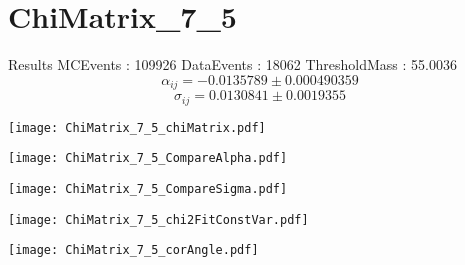 \documentclass[a4paper,12pt]{article}
\begin{document}
\section{ChiMatrix\_7\_5}
\begin{minipage}{0.49\linewidth} Results \newline
MCEvents : 109926\newline
DataEvents : 18062 \newline
ThresholdMass : 55.0036\\
$$\alpha_{ij} = -0.0135789\pm 0.000490359$$
$$\sigma_{ij} = 0.0130841\pm 0.0019355$$
\end{minipage}\hfill
\begin{minipage}{0.49\linewidth} 
\texttt{[image: ChiMatrix\_7\_5\_chiMatrix.pdf]}\\
\end{minipage}
\hfill
\begin{minipage}{0.49\linewidth} 
\texttt{[image: ChiMatrix\_7\_5\_CompareAlpha.pdf]}\\
\end{minipage}
\hfill
\begin{minipage}{0.49\linewidth} 
\texttt{[image: ChiMatrix\_7\_5\_CompareSigma.pdf]}\\
\end{minipage}
\begin{minipage}{0.49\linewidth} 
\texttt{[image: ChiMatrix\_7\_5\_chi2FitConstVar.pdf]}\\
\end{minipage}
\hfill
\begin{minipage}{0.49\linewidth} 
\texttt{[image: ChiMatrix\_7\_5\_corAngle.pdf]}\\
\end{minipage}
\end{document}
